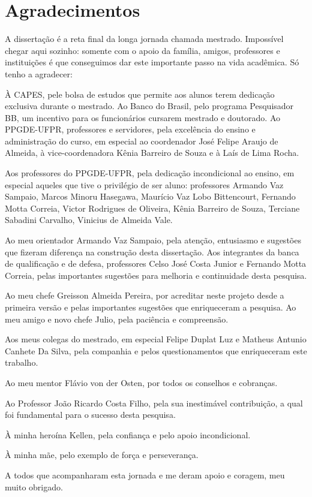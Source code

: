\documentclass[../thesis.tex]{subfiles}
\begin{document}
	
	\newpage
	
	\section*{Agradecimentos} %
	
	\begin{spacing}{1.1}
		
	A dissertação é a reta final da longa jornada chamada mestrado. Impossível chegar aqui sozinho: somente com o apoio da família, amigos, professores e instituições é que conseguimos dar este importante passo na vida acadêmica. Só tenho a agradecer:
	
	À CAPES, pele bolsa de estudos que permite aos alunos terem dedicação exclusiva durante o mestrado. Ao Banco do Brasil, pelo programa Pesquisador BB, um incentivo para os funcionários cursarem mestrado e doutorado. Ao PPGDE-UFPR, professores e servidores, pela excelência do ensino e administração do curso, em especial ao coordenador José Felipe Araujo de Almeida, à vice-coordenadora Kênia Barreiro de Souza e à Laís de Lima Rocha.

	Aos professores do PPGDE-UFPR, pela dedicação incondicional ao ensino, em especial aqueles que tive o privilégio de ser aluno: professores Armando Vaz Sampaio, Marcos Minoru Hasegawa, Maurício Vaz Lobo Bittencourt, Fernando Motta Correia, Victor Rodrigues de Oliveira, Kênia Barreiro de Souza, Terciane Sabadini Carvalho, Vinicius de Almeida Vale. %
	
	Ao meu orientador Armando Vaz Sampaio, pela atenção, entusiasmo e sugestões que fizeram diferença na construção desta dissertação. Aos integrantes da banca de qualificação e de defesa, professores Celso José Costa Junior e Fernando Motta Correia, pelas importantes sugestões para melhoria e continuidade desta pesquisa.

	Ao meu chefe Greisson Almeida Pereira, por acreditar neste projeto desde a primeira versão e pelas importantes sugestões que enriqueceram a pesquisa. Ao meu amigo e novo chefe Julio, pela paciência e compreensão.
	
	Aos meus colegas do mestrado, em especial Felipe Duplat Luz e Matheus Antunio Canhete Da Silva, pela companhia e pelos questionamentos que enriqueceram este trabalho.
	
	Ao meu mentor Flávio von der Osten, por todos os conselhos e cobranças.
	
	Ao Professor João Ricardo Costa Filho, pela sua inestimável contribuição, a qual foi fundamental para o sucesso desta pesquisa.
	
	À minha heroína Kellen, pela confiança e pelo apoio incondicional.
	
	À minha mãe, pelo exemplo de força e perseverança.
	
	A todos que acompanharam esta jornada e me deram apoio e coragem, meu muito obrigado.
	
	\end{spacing}
	
	\thispagestyle{empty}
\end{document}
